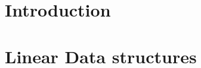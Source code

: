 \documentclass[a4paper]{report}
\begin{document}
\chapter{Introduction}



\chapter{ Linear Data structures }

\end{document}

